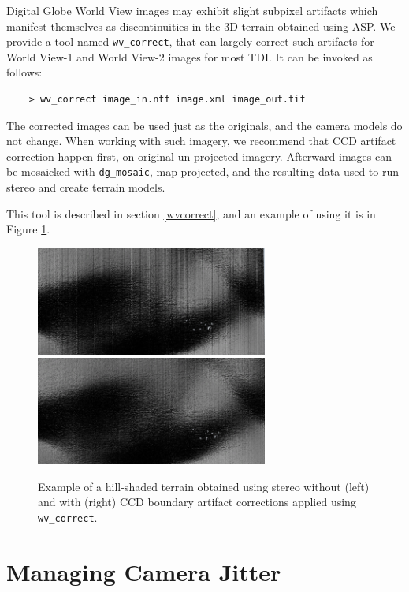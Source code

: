Digital Globe World View images \cite{digital-globe:camera} may exhibit
slight subpixel artifacts which manifest themselves as discontinuities
in the 3D terrain obtained using ASP. We provide a tool named
\texttt{wv\_correct}, that can largely correct such artifacts for World
View-1 and World View-2 images for most TDI. It can be invoked as
follows:

\begin{verbatim}
    > wv_correct image_in.ntf image.xml image_out.tif
\end{verbatim}

The corrected images can be used just as the originals, and the camera
models do not change. When working with such imagery, we recommend that
CCD artifact correction happen first, on original un-projected
imagery. Afterward images can be mosaicked with \texttt{dg\_mosaic},
map-projected, and the resulting data used to run stereo and create
terrain models.

This tool is described in section \ref{wvcorrect}, and an example of
using it is in Figure \ref{fig:ccd-artifact-example}.

\begin{figure}[h!]
\centering
  \includegraphics[width=3.0in]{images/examples/ccd_before_600px.png}
  \includegraphics[width=3.0in]{images/examples/ccd_after_600px.png}
\caption{Example of a hill-shaded terrain obtained using stereo without (left) and with (right) CCD boundary artifact corrections applied using \texttt{wv\_correct}.}
\label{fig:ccd-artifact-example}
\end{figure}

\section{Managing Camera Jitter}
\label{sec:jitter}

